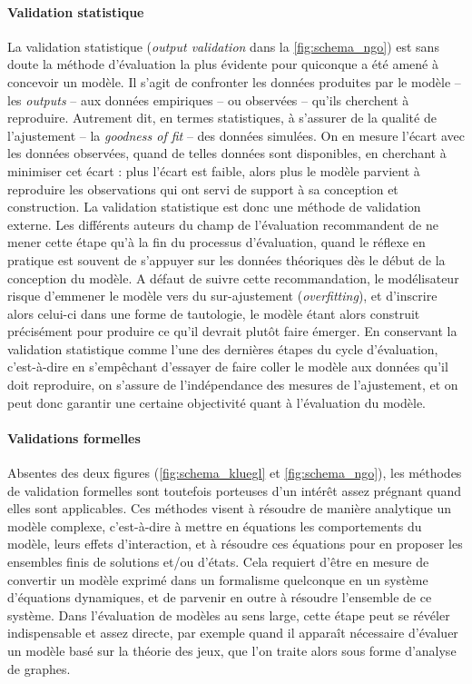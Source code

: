 \paragraph{Validation statistique}
La validation statistique (\og \textit{output validation}\fg{} dans la \cref{fig:schema_ngo}) est sans doute la méthode d'évaluation la plus évidente pour quiconque a été amené à concevoir un modèle. Il s'agit de confronter les données produites par le modèle -- les \textit{outputs} --
aux données empiriques -- ou observées -- qu'ils cherchent à reproduire.
Autrement dit, en termes statistiques, à s'assurer de la qualité de l'ajustement -- la \textit{goodness of fit} -- des données simulées.
On en mesure l'écart avec les données observées, quand de telles données sont disponibles, en cherchant à minimiser cet écart : plus l'écart est faible, alors plus le modèle parvient à reproduire les observations qui ont servi de support à sa conception et construction.
La validation statistique est donc une méthode de validation externe.
Les différents auteurs du champ de l'évaluation recommandent de ne mener cette étape qu'à la fin du processus d'évaluation, quand le réflexe en pratique est souvent de s'appuyer sur les données théoriques dès le début de la conception du modèle.
A défaut de suivre cette recommandation, le modélisateur risque d'emmener le modèle vers du \og sur-ajustement \fg{} (\textit{overfitting}), et d'inscrire alors celui-ci dans une forme de tautologie, le modèle étant alors construit précisément pour produire ce qu'il devrait plutôt faire émerger.
En conservant la validation statistique comme l'une des dernières étapes du cycle d'évaluation, c'est-à-dire en s'empêchant d'essayer de faire coller le modèle aux données qu'il doit reproduire, on s'assure de l'indépendance des mesures de l'ajustement, et on peut donc garantir une certaine objectivité quant à l'évaluation du modèle.

\paragraph{Validations formelles}
Absentes des deux figures (\ref{fig:schema_kluegl} et \ref{fig:schema_ngo}), les méthodes de validation formelles sont toutefois porteuses d'un intérêt assez prégnant quand elles sont applicables.
Ces méthodes visent à résoudre de manière analytique un modèle complexe, c'est-à-dire à mettre en équations les comportements du modèle, leurs effets d'interaction, et à résoudre ces équations pour en proposer les ensembles finis de solutions et/ou d'états.
Cela requiert d'être en mesure de convertir un modèle exprimé dans un formalisme quelconque en un système d'équations dynamiques, et de parvenir en outre à résoudre l'ensemble de ce système.
Dans l'évaluation de modèles au sens large, cette étape peut se révéler indispensable et assez directe, par exemple quand il apparaît nécessaire d'évaluer un modèle basé sur la théorie des jeux, que l'on traite alors sous forme d'analyse de graphes.

